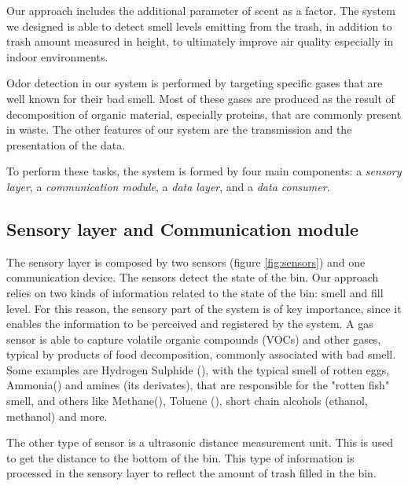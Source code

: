 Our approach includes the additional parameter of scent as a factor.
The system we designed is able to detect smell levels emitting from the trash, in addition to trash amount measured in height, to ultimately improve air quality especially in indoor environments.

Odor detection in our system is performed by targeting specific gases that are well known for their bad smell.
Most of these gases are produced as the result of decomposition of organic material, especially proteins, that are commonly present in waste.
The other features of our system are the transmission and the presentation of the data.


To perform these tasks, the system is formed by four main components: a \textit{sensory layer}, a \textit{communication module},  a \textit{	data layer}, and a \textit{data consumer}. 

\subsection{Sensory layer and Communication module}
The sensory layer is composed by two sensors (figure \ref{fig:sensors}) and one communication device. The sensors detect the state of the bin.
Our approach relies on two kinds of information related to the state of the bin: smell and fill level.
For this reason, the sensory part of the system is of key importance, since it enables the information to be perceived and registered by the system.
A gas sensor is able to capture volatile organic compounds (VOCs) and other gases, typical by products of food decomposition, commonly associated with bad smell. 
Some examples are Hydrogen Sulphide (), with the typical smell of rotten eggs, Ammonia() and amines (its derivates), that are responsible for the "rotten fish" smell, and others like Methane(), Toluene (), short chain alcohols (ethanol, methanol) and more.

The other type of sensor is a ultrasonic distance measurement unit. This is used to get the distance to the bottom of the bin.
This type of information is processed in the sensory layer to reflect the amount of trash filled in the bin.

